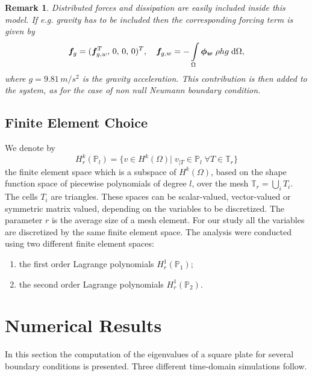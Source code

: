 \documentclass{ifacconf}
\newtheorem{remark}{Remark}
\begin{document}
\begin{remark}
Distributed forces and dissipation are easily included inside this model. If e.g. gravity has to be included then the corresponding forcing term is given by 
\begin{equation}
\begin{aligned}
\bm{f}_g = (\bm{f}_{g, w}^T,\, 0,\, 0, \, 0 )^T, \quad
\bm{f}_{g, w} = -\int_{\Omega} \bm{\phi_w} \; \rho h g \d{\Omega},
\end{aligned}
\end{equation}
where $g = 9.81 \, m/s^2$ is the gravity acceleration. This contribution is then added to the system, as for the case of non null Neumann boundary condition.
\end{remark}

\subsection{Finite Element Choice}
\label{subsec:FE}

We denote by 
\[ H_r^k(\mathbb{P}_l) = \{ v \in H^k(\Omega)|\; v_{|T} \in \mathbb{P}_l \; \forall T \in \mathbb{T}_r \} 
\]
the finite element space which is a subspace of $H^k(\Omega)$, based on the shape function space of piecewise polynomials of degree $l$, over the mesh $\mathbb{T}_r = \bigcup_i T_i$. The cells $T_i$ are triangles. These spaces can be scalar-valued, vector-valued or symmetric matrix valued, depending on the variables to be discretized. The parameter $r$ is the average size of a mesh element. For our study all the variables are discretized by the same finite element space. The analysis were conducted using two different finite element spaces:
\begin{enumerate}
	\item the first order Lagrange polynomials $H_r^1(\mathbb{P}_1)$;
	\item the second order Lagrange polynomials $H_r^1(\mathbb{P}_2)$.
\end{enumerate}

\section{Numerical Results}

In this section the computation of the eigenvalues of a square plate for several boundary conditions is presented. Three different time-domain simulations follow.
\end{document}
